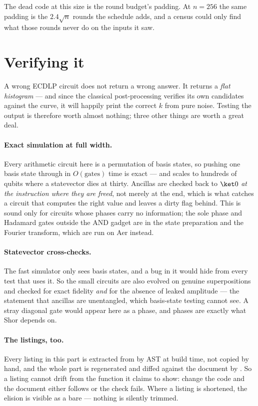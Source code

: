 \noindent The dead code at this size is the round budget's padding. At $n=256$ the same padding is
the $2.4\sqrt n$ rounds the schedule adds, and a census could only find what those rounds never do
on the inputs it saw.

\section{Verifying it}\label{ec:sec:verify}

A wrong ECDLP circuit does not return a wrong answer. It returns a \emph{flat histogram} --- and
since the classical post-processing verifies its own candidates against the curve, it will happily
print the correct $k$ from pure noise. Testing the output is therefore worth almost nothing; three
other things are worth a great deal.

\paragraph{Exact simulation at full width.}
Every arithmetic circuit here is a permutation of basis states, so pushing one basis state through
in $O(\text{gates})$ time is exact --- and scales to hundreds of qubits where a statevector dies at
thirty. Ancillas are checked back to $\ket0$ \emph{at the instruction where they are freed}, not
merely at the end, which is what catches a circuit that computes the right value and leaves a dirty
flag behind. This is sound only for circuits whose phases carry no information; the sole phase and
Hadamard gates outside the AND gadget are in the state preparation and the Fourier transform, which
are run on Aer instead.


\paragraph{Statevector cross-checks.}
The fast simulator only sees basis states, and a bug in it would hide from every test that uses it.
So the small circuits are also evolved on genuine superpositions and checked for exact fidelity
\emph{and} for the absence of leaked amplitude --- the statement that ancillas are unentangled,
which basis-state testing cannot see. A stray diagonal gate would appear here as a phase, and phases
are exactly what Shor depends on.

\paragraph{The listings, too.}
Every listing in this part is extracted from  by AST at build time, not
copied by hand, and the whole part is regenerated and diffed against the document by
. So a listing cannot drift from the function it claims to show:
change the code and the document either follows or the check fails. Where a listing is shortened,
the elision is visible as a bare  --- nothing is silently trimmed.

